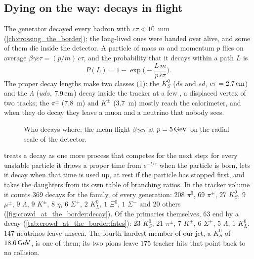 \subsection{Dying on the way: decays in flight}
\label{sec:crowd_at_the_border:decays}
The generator decayed every hadron with $c\tau<10$~mm
(\cref{ch:crossing_the_border}); the long-lived ones were handed over
alive, and some of them die inside the detector. A particle of mass $m$ and
momentum $p$ flies on average $\beta\gamma c\tau=(p/m)\,c\tau$, and the
probability that it decays within a path $L$ is
\begin{equation}
  P(L) = 1-\exp\!\Big(-\frac{L\,m}{p\,c\tau}\Big).
  \label{eq:crowd_at_the_border:decay}
\end{equation}
The proper decay lengths make two classes
(\cref{fig:crowd_at_the_border:decay_sketch}): the $K^0_S$ ($d\bar s$ and
$s\bar d$, $c\tau=2.7\,\mathrm{cm}$) and the $\Lambda$ ($uds$, $7.9\,\mathrm{cm}$) decay inside
the tracker at a few \GeV, a displaced vertex of two tracks; the $\pi^\pm$
($7.8$~m) and $K^\pm$ ($3.7$~m) mostly reach the calorimeter, and when they
do decay they leave a muon and a neutrino that nobody sees.

\begin{figure}[htbp]\centering
\resizebox{0.92\textwidth}{!}{}
\caption[Who decays where]{Who decays where: the mean flight
$\beta\gamma c\tau$ at $p=5\,\mathrm{GeV}$ on the radial scale of the detector.}
\label{fig:crowd_at_the_border:decay_sketch}
\end{figure}

\GEANT treats a decay as one more process that competes for the next step:
for every unstable particle it draws a proper time from $e^{-t/\tau}$ when
the particle is born, lets it decay when that time is used up, at rest if
the particle has stopped first, and takes the daughters from its own table
of branching ratios. In the tracker volume it counts
$369$ decays for the family, of every generation:
$208$ $\pi^0$, $69$ $\pi^\pm$, $27$ $K^0_S$, $9$ $\mu^\pm$, $9$ $\Lambda$, $9$ $K^\pm$, $8$ $\eta$, $6$ $\Sigma^+$, $2$ $K^0_L$, $1$ $\Xi^0$, $1$ $\Sigma^-$ and $20$ others (\cref{fig:crowd_at_the_border:decay}). Of the primaries
themselves, $63$ end by a decay
(\cref{tab:crowd_at_the_border:fates}): $23$ $K^0_S$, $21$ $\pi^\pm$, $7$ $K^\pm$, $6$ $\Sigma^+$, $5$ $\Lambda$, $1$ $K^0_L$.
$147$ neutrinos leave unseen. The fourth-hardest member of our jet, a $K^0_S$ of $18.6\,\mathrm{GeV}$, is one of them; its two pions leave $175$ tracker hits that point back to no collision.

